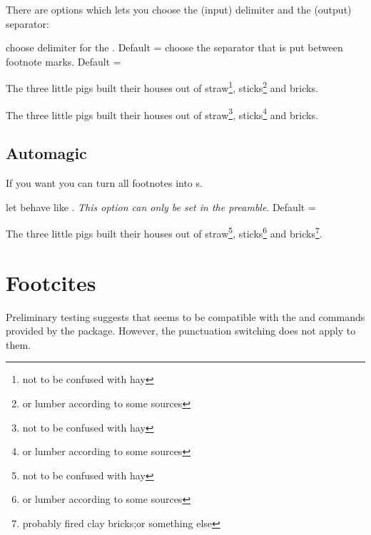 \documentclass[toc=index,toc=bib]{cnpkgdoc}
\renewcommand\thempfootnote{\arabic{mpfootnote}}
\begin{document}
There are options which lets you choose the (input) delimiter and the (output)
separator:
\begin{beschreibung}
  choose delimiter for the .
 Default = \code{;}
  choose the separator that is put between footnote
 marks. Default = \code{,}
\end{beschreibung}
\begin{beispiel}
 \begin{minipage}[t]{.4\linewidth}
  \noindent The three little pigs built their houses
  out of straw\footnote{not to be confused with hay},
  sticks\footnote{or lumber according to some sources}
  and bricks.
 \end{minipage}
 \renewcommand*\thempfootnote{\fnsymbol{mpfootnote}}
 \begin{minipage}[t]{.4\linewidth}
  \noindent The three little pigs built their houses
  out of straw\footnote{not to be confused with hay},
  sticks\footnote{or lumber according to some sources}
  and bricks.
 \end{minipage}
\end{beispiel}

\subsection{Automagic}
If you want you can turn all footnotes into s.
\begin{beschreibung}
  let  behave like .
 \emph{This option can only be set in the preamble}. Default = 
\end{beschreibung}
\begin{beispiel}
 \begin{minipage}{.4\linewidth}
  \noindent The three little pigs built their houses
  out of straw\footnote{not to be confused with hay},
  sticks\footnote{or lumber according to some sources}
  and bricks\footnote{probably fired clay bricks;or
  something else}.
 \end{minipage}
\end{beispiel}

\section{Footcites}
Preliminary testing suggests that \fnpct seems to be compatible with the
 and  commands provided by the 
package. However, the punctuation switching does not apply to them.
\end{document}
